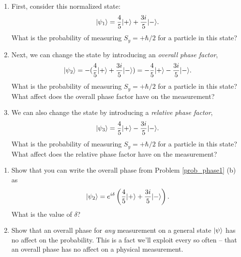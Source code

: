 \begin{problem}
\label{prob_phase1}
\begin{enumerate}[label=(\alph*)] 
\item First, consider this normalized state:
\[
| \psi_1 \rangle = \frac{4}{5} | + \rangle + \frac{3i}{5} | - \rangle.
\]
What is the probability of measuring $S_y = +\hbar/2$ for a particle in this state?
\item Next, we can change the state by introducing an \emph{overall phase factor},
\[
| \psi_2 \rangle = -(\frac{4}{5} | + \rangle + \frac{3i}{5} | - \rangle) = -\frac{4}{5} | + \rangle - \frac{3i}{5} | - \rangle.
\]
What is the probability of measuring $S_y = +\hbar/2$ for a particle in this state?  What affect does the overall phase factor have on the measurement?
\item We can also change the state by introducing a \emph{relative phase factor},
\[
| \psi_3 \rangle = \frac{4}{5} | + \rangle - \frac{3i}{5} | - \rangle.
\]
What is the probability of measuring $S_y = +\hbar/2$ for a particle in this state?  What affect does the relative phase factor have on the measurement?
\end{enumerate}
\end{problem}

\begin{problem}
\label{prob_rel_phase}
\begin{enumerate}[label=(\alph*)] 
\item Show that you can write the overall phase from Problem \ref{prob_phase1} (b) as
\[
| \psi_2 \rangle = e^{i\delta} \left( \frac{4}{5} | + \rangle + \frac{3i}{5} | - \rangle \right).
\]
What is the value of $\delta$?
\item Show that an overall phase for \emph{any} measurement on a general state $| \psi \rangle$ has no affect on the probability.  This is a fact we'll exploit every so often -- that an overall phase has no affect on a physical measurement. 
\end{enumerate}
\end{problem}

